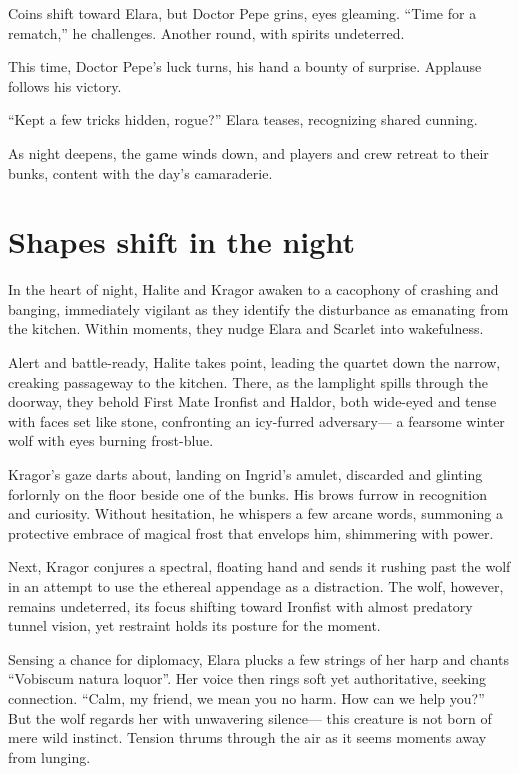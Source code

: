 \documentclass[
  letterpaper,12pt,twoside,twocolumn,openany,
  nodeprecatedcode,bg=full]{dndbook}
\begin{document}
Coins shift toward Elara, but Doctor Pepe grins, eyes gleaming. ``Time
for a rematch,'' he challenges. Another round, with spirits undeterred.

This time, Doctor Pepe's luck turns, his hand a bounty of surprise.
Applause follows his victory.

``Kept a few tricks hidden, rogue?'' Elara teases, recognizing shared
cunning.

As night deepens, the game winds down, and players and crew retreat to
their bunks, content with the day's camaraderie.

\section{Shapes shift in the night}\label{shapes-shift-in-the-night}

In the heart of night, Halite and Kragor awaken to a cacophony of
crashing and banging, immediately vigilant as they identify the
disturbance as emanating from the kitchen. Within moments, they nudge
Elara and Scarlet into wakefulness.

Alert and battle-ready, Halite takes point, leading the quartet down the
narrow, creaking passageway to the kitchen. There, as the lamplight
spills through the doorway, they behold First Mate Ironfist and Haldor,
both wide-eyed and tense with faces set like stone, confronting an
icy-furred adversary--- a fearsome winter wolf with eyes burning
frost-blue.

Kragor's gaze darts about, landing on Ingrid's amulet, discarded and
glinting forlornly on the floor beside one of the bunks. His brows
furrow in recognition and curiosity. Without hesitation, he whispers a
few arcane words, summoning a protective embrace of magical frost that
envelops him, shimmering with power.

Next, Kragor conjures a spectral, floating hand and sends it rushing
past the wolf in an attempt to use the ethereal appendage as a
distraction. The wolf, however, remains undeterred, its focus shifting
toward Ironfist with almost predatory tunnel vision, yet restraint holds
its posture for the moment.

Sensing a chance for diplomacy, Elara plucks a few strings of her harp
and chants ``Vobiscum natura loquor''. Her voice then rings soft yet
authoritative, seeking connection. ``Calm, my friend, we mean you no
harm. How can we help you?'' But the wolf regards her with unwavering
silence--- this creature is not born of mere wild instinct. Tension
thrums through the air as it seems moments away from lunging.
\end{document}
